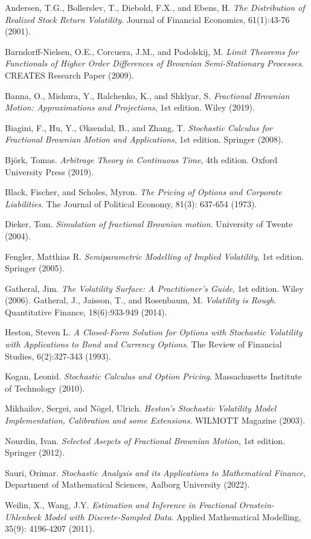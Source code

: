\documentclass[11pt,a4paper,twoside,openright,english]{book}
\begin{document}
%
%
\begin{thebibliography}{}
Andersen, T.G., Bollerslev, T., Diebold, F.X., and Ebens, H. \textit{The Distribution of Realized Stock Return Volatility}. Journal of Financial Economics, 61(1):43-76 (2001).

Barndorff-Nielsen, O.E., Corcuera, J.M., and Podolskij, M. \textit{Limit Theorems for Functionals of Higher Order Differences of Brownian Semi-Stationary Processes}. CREATES Research Paper (2009).

Banna, O., Mishura, Y., Ralchenko, K., and Shklyar, S. \textit{Fractional Brownian Motion: Approximations and Projections}, 1st edition. Wiley (2019).

Biagini, F., Hu, Y., Øksendal, B., and Zhang, T. \textit{Stochastic Calculus for Fractional Brownian Motion and Applications}, 1st edition. Springer (2008).

Björk, Tomas. \textit{Arbitrage Theory in Continuous Time}, 4th edition. Oxford University Press (2019).

Black, Fischer, and Scholes, Myron. \textit{The Pricing of Options and Corporate Liabilities}. The Journal of Political Economy, 81(3): 637-654 (1973).

Dieker, Tom. \textit{Simulation of fractional Brownian motion}. University of Twente (2004).

Fengler, Matthias R. \textit{Semiparametric Modelling of Implied Volatility}, 1st edition. Springer (2005).

Gatheral, Jim. \textit{The Volatility Surface: A Practitioner's Guide}, 1st edition. Wiley (2006).
Gatheral, J., Jaisson, T., and Rosenbaum, M. \textit{Volatility is Rough}. Quantitative Finance, 18(6):933-949 (2014).

Heston, Steven L. \textit{A Closed-Form Solution for Options with Stochastic Volatility with Applications to Bond and Currency Options}. The Review of Financial Studies, 6(2):327-343 (1993).

Kogan, Leonid. \textit{Stochastic Calculus and Option Pricing}. Massachusetts Institute of Technology (2010).

Mikhailov, Sergei, and Nögel, Ulrich. \textit{Heston's Stochastic Volatility Model Implementation, Calibration and some Extensions}. WILMOTT Magazine (2003).

Nourdin, Ivan. \textit{Selected Asepcts of Fractional Brownian Motion}, 1st edition. Springer (2012).

Sauri, Orimar. \textit{Stochastic Analysis and its Applications to Mathematical Finance}, Department of Mathematical Sciences, Aalborg University (2022).

Weilin, X., Wang, J.Y. \textit{Estimation and Inference in Fractional Ornstein-Uhlenbeck Model with Discrete-Sampled Data}. Applied Mathematical Modelling, 35(9): 4196-4207 (2011).
\end{thebibliography}{}
\end{document}
